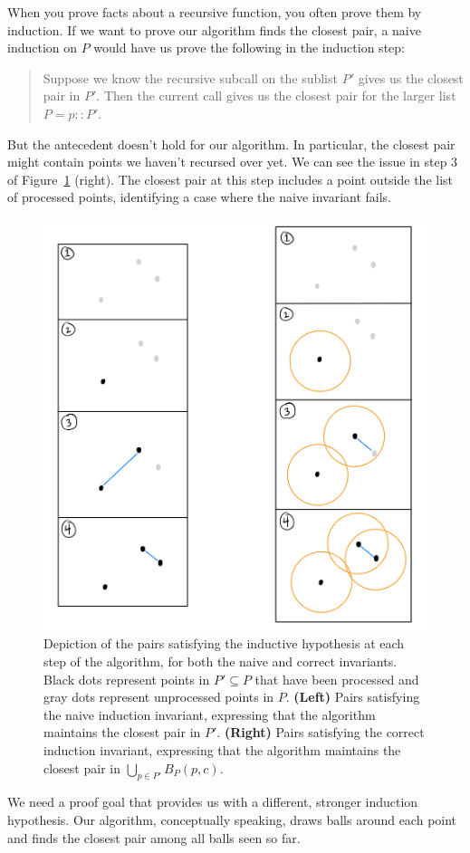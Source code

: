 \documentclass{article}
\begin{document}
When you prove facts about a recursive function, you often prove them by induction.
If we want to prove our algorithm finds the closest pair, a naive induction on $P$ would have us prove the following in the induction step:
\begin{quote}
  Suppose we know the recursive subcall on the sublist $P'$ gives us the closest pair in $P'$.
  Then the current call gives us the closest pair for the larger list $P = p :: P'$.
\end{quote}
But the antecedent doesn't hold for our algorithm.
In particular, the closest pair might contain points we haven't recursed over yet.
We can see the issue in step 3 of Figure~\ref{fig:aux_invariant} (right).
The closest pair at this step includes a point outside the list of processed points, identifying a case where the naive invariant fails.
\begin{figure}[H]
  \begin{center}
  \includegraphics[width=0.5\linewidth]{res/aux_invariant}
  \end{center}
  \caption{
    Depiction of the pairs satisfying the inductive hypothesis at each step of the algorithm, for both the naive and correct invariants.
    Black dots represent points in $P' \subseteq P$ that have been processed and gray dots represent unprocessed points in $P$.
    \textbf{(Left)}
      Pairs satisfying the naive induction invariant, expressing that the algorithm maintains the closest pair in $P'$.
    \textbf{(Right)}
      Pairs satisfying the correct induction invariant, expressing that the algorithm maintains the closest pair in $\bigcup_{p \in P'}B_P(p, c)$.
  }\label{fig:aux_invariant}
\end{figure}
We need a proof goal that provides us with a different, stronger induction hypothesis.
Our algorithm, conceptually speaking, draws balls around each point and finds the closest pair among all balls seen so far.
\end{document}
